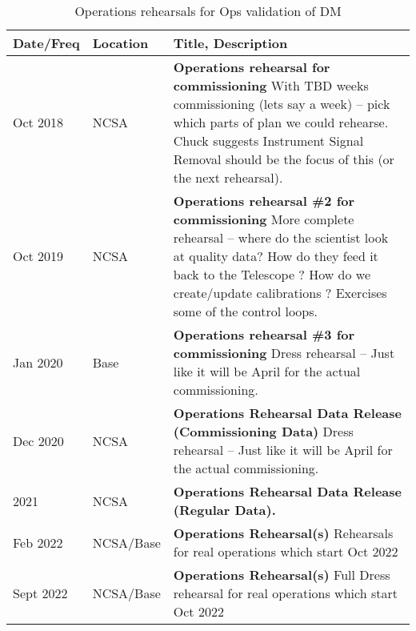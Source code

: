 \begin{longtable} {|l|l|p{}|}
	\caption{Operations rehearsals for Ops validation of DM \label{tab:ors}}\\  %
	\hline
\textbf{Date/Freq} &\textbf{Location}& \textbf{Title, Description} \\ \hline

Oct 2018 &  NCSA & \textbf{Operations rehearsal for commissioning }
	With TBD weeks commissioning (lets say a week) -- pick which parts of plan we could rehearse.
	Chuck suggests Instrument Signal Removal should be the focus of this (or the next rehearsal).
	\\ \hline
Oct 2019 & NCSA &  \textbf{ Operations rehearsal \#2 for commissioning}
More complete rehearsal -- where do the scientist look at quality data? How do they feed it back to the Telescope ?
How do we create/update calibrations ? Exercises some of the control loops.
\\ \hline
Jan 2020 & Base  &  \textbf{ Operations rehearsal \#3 for commissioning}
Dress rehearsal -- Just like it will be April for the actual commissioning.
	\\ \hline
Dec 2020 &  NCSA &  \textbf{Operations  Rehearsal Data Release (Commissioning Data)}
	Dress rehearsal -- Just like it will be April for the actual commissioning.
	\\ \hline

2021 &  NCSA &  \textbf{Operations  Rehearsal Data Release (Regular Data).}
	\\ \hline

Feb 2022 &  NCSA/Base &  \textbf{Operations  Rehearsal(s)}
Rehearsals for real operations which start Oct 2022
	\\ \hline
Sept 2022 &  NCSA/Base &  \textbf{Operations  Rehearsal(s)}
Full Dress rehearsal for real operations which start Oct 2022
	\\ \hline


\end{longtable}

